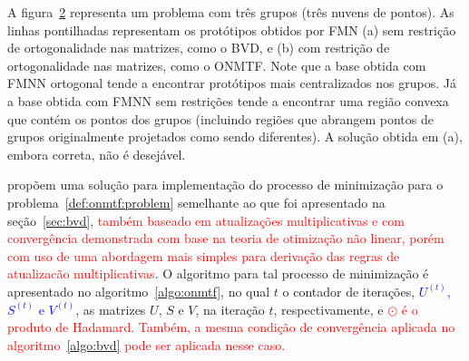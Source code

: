 \documentclass[
    12pt,                %
    oneside,            %
    a4paper,            %
    english,            %
    brazil                %
    ]{abntex2ppgsi}
\begin{document}
\begin{figure} [htpb]
\begin{subfigure}[b]{0.3\textwidth}
        \caption{}
        \label{fig:bvdvsonmtf:2}
    \end{subfigure}


    \label{fig:bvdvsonmtf}
\end{figure}

A figura~\ref{fig:bvdvsonmtf} representa um problema com três grupos (três nuvens de pontos). As linhas pontilhadas representam os protótipos obtidos por FMN (a) sem restrição de ortogonalidade nas matrizes, como o BVD, e (b) com restrição de ortogonalidade nas matrizes, como o ONMTF. Note que a base obtida com FMNN ortogonal tende a encontrar protótipos mais centralizados nos grupos. Já a base obtida com FMNN sem restrições tende a encontrar uma região convexa que contém os pontos dos grupos (incluindo regiões que abrangem pontos de grupos originalmente projetados como sendo diferentes). A solução obtida em (a), embora correta, não é desejável.

 propõem uma solução para implementação do processo de minimização para o problema~\ref{def:onmtf:problem} semelhante ao que foi apresentado na seção~\ref{sec:bvd}, \textcolor{red}{também baseado em atualizações multiplicativas e com convergência demonstrada com base na teoria de otimização não linear, porém com uso de uma abordagem mais simples para derivação das regras de atualizacão multiplicativas}. O algoritmo para tal processo de minimização é apresentado no algoritmo~\ref{algo:onmtf}, no qual  $t$ o contador de iterações, \textcolor{blue}{$U^{(t)}$, $S^{(t)}$ e $V^{(t)}$}, as matrizes $U$, $S$ e $V$, na iteração $t$, respectivamente, e \textcolor{red}{$\odot$ é o produto de Hadamard. Também, a mesma condição de convergência aplicada no algoritmo~\ref{algo:bvd} pode ser aplicada nesse caso.}
\end{document}
